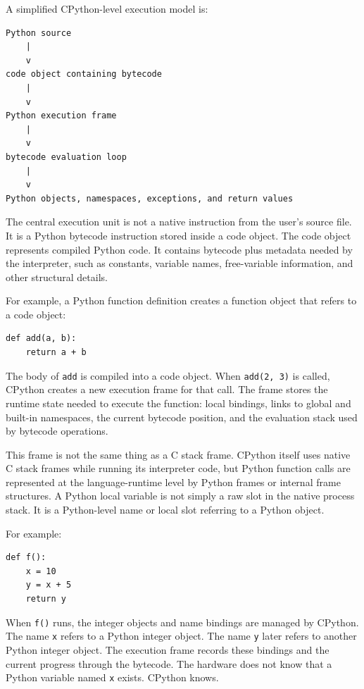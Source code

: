 \documentclass[a4paper,twoside]{report}
\begin{document}
A simplified CPython-level execution model is:

\begin{verbatim}
Python source
    |
    v
code object containing bytecode
    |
    v
Python execution frame
    |
    v
bytecode evaluation loop
    |
    v
Python objects, namespaces, exceptions, and return values
\end{verbatim}

The central execution unit is not a native instruction from the user's source file. It is a Python bytecode instruction stored inside a code object. The code object represents compiled Python code. It contains bytecode plus metadata needed by the interpreter, such as constants, variable names, free-variable information, and other structural details.

For example, a Python function definition creates a function object that refers to a code object:

\begin{verbatim}
def add(a, b):
    return a + b
\end{verbatim}

The body of \texttt{add} is compiled into a code object. When \texttt{add(2, 3)} is called, CPython creates a new execution frame for that call. The frame stores the runtime state needed to execute the function: local bindings, links to global and built-in namespaces, the current bytecode position, and the evaluation stack used by bytecode operations.

This frame is not the same thing as a C stack frame. CPython itself uses native C stack frames while running its interpreter code, but Python function calls are represented at the language-runtime level by Python frames or internal frame structures. A Python local variable is not simply a raw slot in the native process stack. It is a Python-level name or local slot referring to a Python object.

For example:

\begin{verbatim}
def f():
    x = 10
    y = x + 5
    return y
\end{verbatim}

When \texttt{f()} runs, the integer objects and name bindings are managed by CPython. The name \texttt{x} refers to a Python integer object. The name \texttt{y} later refers to another Python integer object. The execution frame records these bindings and the current progress through the bytecode. The hardware does not know that a Python variable named \texttt{x} exists. CPython knows.
\end{document}
